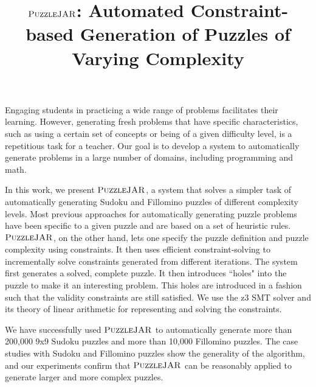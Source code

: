 \documentclass[12pt]{article}
\date{}
\begin{document}
\doublespacing


\title{$\textsc{PuzzleJAR}$: Automated Constraint-based Generation of Puzzles of Varying Complexity}

\maketitle

Engaging students in practicing a wide range of problems facilitates their learning. However, generating fresh problems that have specific characteristics, such as using a certain set of concepts or being of a given difficulty level, is a repetitious task for a teacher. Our goal is to develop a system to automatically generate problems in a large number of domains, including programming and math. 

In this work, we present $\textsc{PuzzleJAR}$, a system that solves a simpler task of automatically generating
Sudoku and Fillomino puzzles of different complexity levels. Most previous
approaches for automatically generating puzzle problems have been
specific to a given puzzle and are based on a set of heuristic
rules. $\textsc{PuzzleJAR}$, on the other hand, lets one specify the puzzle
definition and puzzle complexity using constraints. It then uses efficient constraint-solving to
incrementally solve constraints generated from different
iterations. The system first generates a solved, complete puzzle. It
then introduces ``holes" into the puzzle to make it an interesting
problem. This holes are introduced in a fashion such that the validity
constraints are still satisfied. We use the z3 SMT solver and its
theory of linear arithmetic for representing and solving the constraints.

We have successfully used $\textsc{PuzzleJAR}$ to automatically generate more
than 200,000 9x9 Sudoku puzzles and more than 10,000 Fillomino
puzzles. The case studies with Sudoku and Fillomino puzzles show the
generality of the algorithm, and our experiments confirm that
$\textsc{PuzzleJAR}$ can be reasonably applied to generate larger and more complex puzzles.
\end{document}
